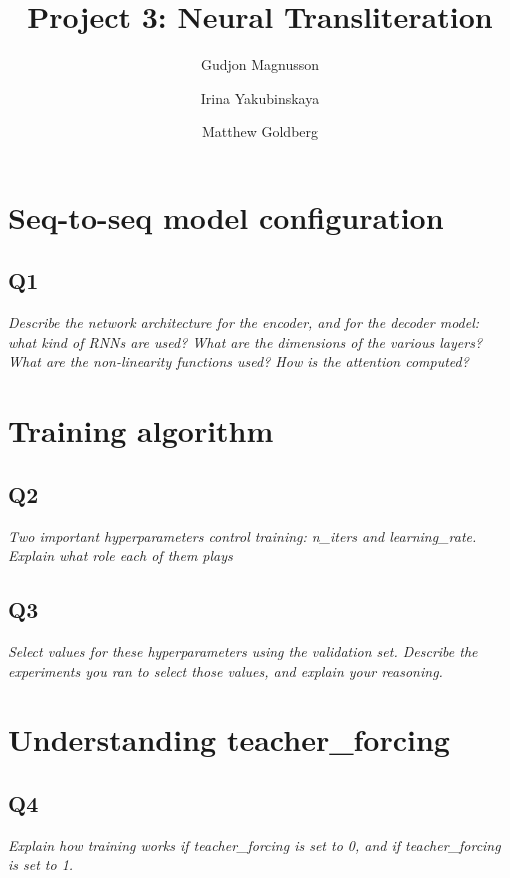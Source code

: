 \documentclass[12pt]{article}
\begin{document}
\title{
	Project 3: Neural Transliteration
}
\author{
Gudjon Magnusson 
\and Irina Yakubinskaya 
\and Matthew Goldberg
}

\maketitle


\section{Seq-to-seq model configuration}

\subsection{Q1}
\textit{
Describe the network architecture for the encoder, and for the decoder model: what kind of RNNs are used? What are the dimensions of the various layers? What are the non-linearity functions used? How is the attention computed?
}


\section{Training algorithm}

\subsection{Q2}
\textit{
Two important hyperparameters control training: n\_iters and  learning\_rate. Explain what role each of them plays
}

\subsection{Q3}
\textit{
Select values for these hyperparameters using the validation set. Describe the experiments you ran to select those values, and explain your reasoning.
}

\section{Understanding teacher\_forcing}

\subsection{Q4}
\textit{
Explain how training works if teacher\_forcing is set to 0, and if teacher\_forcing is set to 1.
}
\end{document}
